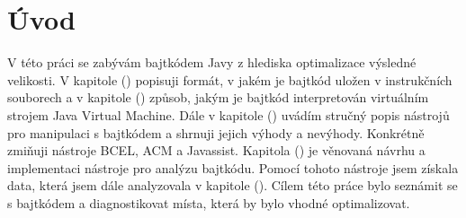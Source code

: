 \chapter{Úvod}


V této práci se zabývám bajtkódem Javy z hlediska optimalizace výsledné velikosti. V kapitole () popisuji formát, v jakém je bajtkód uložen v instrukčních souborech a v kapitole () způsob, jakým je bajtkód interpretován virtuálním strojem Java Virtual Machine. Dále v kapitole () uvádím stručný popis nástrojů pro manipulaci s bajtkódem a shrnuji jejich výhody a nevýhody. Konkrétně zmiňuji nástroje BCEL, ACM a Javassist. Kapitola ()  je věnovaná návrhu a implementaci nástroje pro analýzu bajtkódu. Pomocí tohoto nástroje jsem získala data, která jsem dále analyzovala v kapitole (). Cílem této práce bylo seznámit se s bajtkódem a diagnostikovat místa, která by bylo vhodné optimalizovat.


